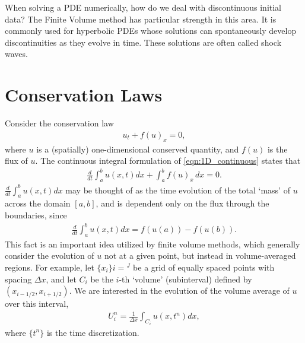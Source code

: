 \label{lab:finitevolume}

When solving a PDE numerically, how do we deal with discontinuous initial data?
The Finite Volume method has particular strength in this area.
It is commonly used for hyperbolic PDEs whose solutions can spontaneously develop discontinuities as they evolve in time.
These solutions are often called shock waves.

\section*{Conservation Laws}
Consider the conservation law
\begin{align}
\label{eqn:1D_continuous}
u_t + f(u)_x = 0,
\end{align}
where $u$ is a (spatially) one-dimensional conserved quantity, and $f(u)$ is the flux of $u$.
The continuous integral formulation of  \eqref{eqn:1D_continuous} states that
\begin{align*}
	\frac{d}{dt}\int_a^b u(x,t) dx + \int_a^b f(u)_x \,dx = 0.
\end{align*}
$\frac{d}{dt}\int_a^b u(x,t) dx$ may be thought of as the time evolution of the total `mass' of $u$ across the domain $[a,b]$, and is dependent only on the flux through the boundaries, since
\begin{align*}
\frac{d}{dt}\int_a^b u(x,t) dx = f(u(a))-f(u(b)).
\end{align*}
This fact is an important idea utilized by finite volume methods, which generally consider the evolution of $u$ not at a given point, but instead in volume-averaged regions.
For example, let $\{x_i\}{i = }^J$ be a grid of equally spaced points with spacing $\Delta x$, and let $C_i$ be the $i$-th `volume' (subinterval) defined by $(x_{i-1/2},x_{i+1/2})$.
We are interested in the evolution of the volume average of $u$ over this interval,
\begin{align*}
U_i^n  = \frac{1}{\Delta x}\int_{C_i} u(x,t^n)dx,
\end{align*}
where $\{t^n\}$ is the time discretization.

